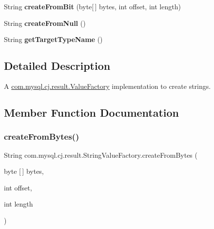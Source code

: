 \begin{DoxyCompactItemize}
\item 
\mbox{\label{classcom_1_1mysql_1_1cj_1_1result_1_1_string_value_factory_affa7f241f076824269476e711d4c1106}} 
String {\bfseries create\+From\+Bit} (byte\mbox{[}$\,$\mbox{]} bytes, int offset, int length)
\item 
\mbox{\label{classcom_1_1mysql_1_1cj_1_1result_1_1_string_value_factory_a8c7fe6d32a4f827298803b7774064bdc}} 
String {\bfseries create\+From\+Null} ()
\item 
\mbox{\label{classcom_1_1mysql_1_1cj_1_1result_1_1_string_value_factory_ae9d043abc23f82f37cc3552f02469ea8}} 
String {\bfseries get\+Target\+Type\+Name} ()
\end{DoxyCompactItemize}


\subsection{Detailed Description}
A \mbox{\hyperlink{interfacecom_1_1mysql_1_1cj_1_1result_1_1_value_factory}{com.\+mysql.\+cj.\+result.\+Value\+Factory}} implementation to create strings. 

\subsection{Member Function Documentation}
\mbox{\label{classcom_1_1mysql_1_1cj_1_1result_1_1_string_value_factory_a72878f32e5fe17e1266d38c9145768b6}} 
\subsubsection{\texorpdfstring{create\+From\+Bytes()}{createFromBytes()}}
{\footnotesize\ttfamily String com.\+mysql.\+cj.\+result.\+String\+Value\+Factory.\+create\+From\+Bytes (\begin{DoxyParamCaption}\item[{byte \mbox{[}$\,$\mbox{]}}]{bytes,  }\item[{int}]{offset,  }\item[{int}]{length }\end{DoxyParamCaption})}

